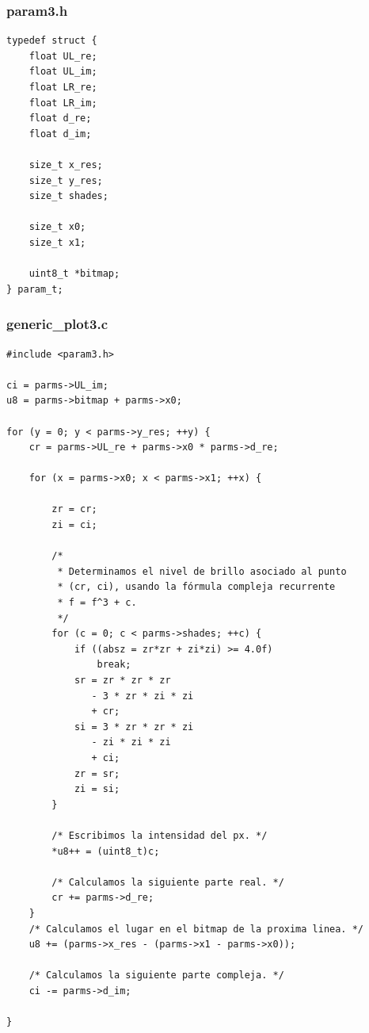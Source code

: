 \documentclass[a4paper,10pt]{article}
\begin{document}
\subsubsection{param3.h}
\begin{verbatim}
typedef struct {
	float UL_re;
	float UL_im;
	float LR_re;
	float LR_im;
	float d_re;
	float d_im;

	size_t x_res;
	size_t y_res;
	size_t shades;

	size_t x0;
	size_t x1;

	uint8_t *bitmap;
} param_t;
\end{verbatim}

\subsubsection{generic\_plot3.c}
\begin{verbatim}
#include <param3.h>

ci = parms->UL_im;
u8 = parms->bitmap + parms->x0;

for (y = 0; y < parms->y_res; ++y) {
	cr = parms->UL_re + parms->x0 * parms->d_re; 

	for (x = parms->x0; x < parms->x1; ++x) {
		
		zr = cr;
		zi = ci;

		/*
		 * Determinamos el nivel de brillo asociado al punto
		 * (cr, ci), usando la fórmula compleja recurrente 
		 * f = f^3 + c.
		 */
		for (c = 0; c < parms->shades; ++c) {
			if ((absz = zr*zr + zi*zi) >= 4.0f)
				break;
			sr = zr * zr * zr
			   - 3 * zr * zi * zi
			   + cr;
			si = 3 * zr * zr * zi
			   - zi * zi * zi
			   + ci;
			zr = sr;
			zi = si;
		}

		/* Escribimos la intensidad del px. */
		*u8++ = (uint8_t)c;

		/* Calculamos la siguiente parte real. */
		cr += parms->d_re;
	}
	/* Calculamos el lugar en el bitmap de la proxima linea. */
	u8 += (parms->x_res - (parms->x1 - parms->x0));

	/* Calculamos la siguiente parte compleja. */
	ci -= parms->d_im;
	
}

\end{verbatim}
\end{document}
